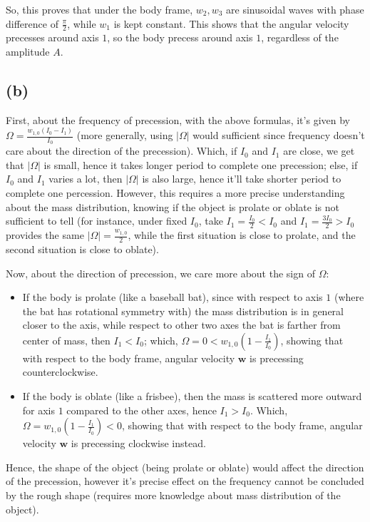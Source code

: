 \documentclass{article}
\newcommand{\bw}{\textbf{w}} %
\begin{document}
So, this proves that under the body frame, $w_2,w_3$ are sinusoidal waves with phase difference of $\frac{\pi}{2}$, while $w_1$ is kept constant. This shows that the angular velocity precesses around axis $1$, so the body precess around axis $1$, regardless of the amplitude $A$.

\subsection*{(b)}
First, about the frequency of precession, with the above formulas, it's given by $\Omega = \frac{w_{1,0}(I_0-I_1)}{I_0}$ (more generally, using $|\Omega|$ would sufficient since frequency doesn't care about the direction of the precession). 
Which, if $I_0$ and $I_1$ are close, we get that $|\Omega|$ is small, hence it takes longer period to complete one precession; else, if $I_0$ and $I_1$ varies a lot, then $|\Omega|$ is also large, hence it'll take shorter period to complete one percession. However, this requires a more precise understanding about the mass distribution, knowing if the object is prolate or oblate is not sufficient to tell (for instance, under fixed $I_0$, take $I_1 = \frac{I_0}{2}<I_0$ and $I_1 = \frac{3I_0}{2}>I_0$ provides the same $|\Omega|=\frac{w_{1,0}}{2}$, while the first situation is close to prolate, and the second situation is close to oblate).

\hfil

Now, about the direction of precession, we care more about the sign of $\Omega$:
\begin{itemize}
    \item If the body is prolate (like a baseball bat), since with respect to axis $1$ (where the bat has rotational symmetry with) the mass distribution is in general closer to the axis, while respect to other two axes the bat is farther from center of mass, then $I_1 < I_0$; which, $\Omega = 0<w_{1,0}(1-\frac{I_1}{I_0})$, showing that with respect to the body frame, angular velocity $\bw$ is precessing counterclockwise.
    \item If the body is oblate (like a frisbee), then the mass is scattered more outward for axis $1$ compared to the other axes, hence $I_1>I_0$. Which, $\Omega=w_{1,0}(1-\frac{I_1}{I_0})<0$, showing that with respect to the body frame, angular velocity $\bw$ is precessing clockwise instead.
\end{itemize}
Hence, the shape of the object (being prolate or oblate) would affect the direction of the precession, however it's precise effect on the frequency cannot be concluded by the rough shape (requires more knowledge about mass distribution of the object).
\end{document}
